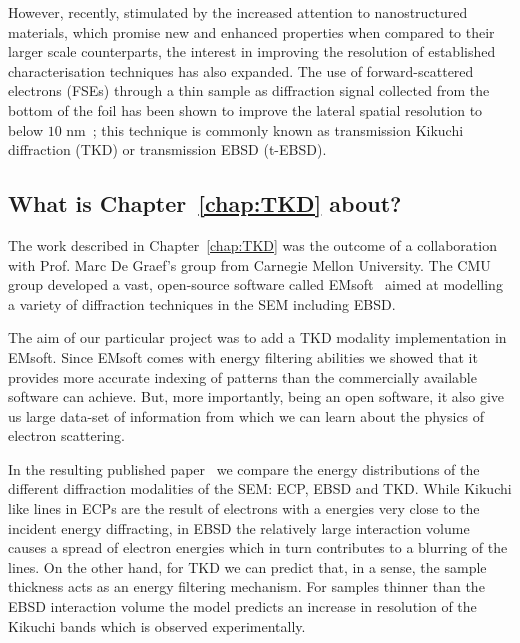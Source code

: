 However, recently, stimulated by the increased attention to nanostructured materials, which promise new and enhanced properties when compared to their larger scale counterparts, the interest in improving the resolution of established characterisation techniques has also expanded. The use of forward-scattered electrons (FSEs) through a thin sample as diffraction signal collected from the bottom of the foil has been shown to improve the lateral spatial resolution to below $10$ nm~\cite{Keller12, Trimby12}; this technique is commonly known as transmission Kikuchi diffraction (TKD) or transmission EBSD (t-EBSD). 

\subsection{What is Chapter~\ref{chap:TKD} about?}

The work described in Chapter~\ref{chap:TKD} was the outcome of a collaboration with Prof. Marc De Graef's group from Carnegie Mellon University. The CMU group developed a vast, open-source software called EMsoft~\cite{EMsoft} aimed at modelling a variety of diffraction techniques in the SEM including EBSD. 

The aim of our particular project was to add a TKD modality implementation in EMsoft. Since EMsoft comes with energy filtering abilities we showed that it provides more accurate indexing of patterns than the commercially available software can achieve. But, more importantly, being an open software, it also give us large data-set of information from which we can learn about the physics of electron scattering.  

In the resulting published paper~\cite{PascalTKD}  we compare the energy distributions of the different diffraction modalities of the SEM: ECP, EBSD and TKD. While Kikuchi like lines in ECPs are the result of electrons with a energies very close to the incident energy diffracting, in EBSD the relatively large interaction volume causes a spread of electron energies which in turn contributes to a blurring of the lines. On the other hand, for TKD we can predict that, in a sense, the sample thickness acts as an energy filtering mechanism. For samples thinner than the EBSD interaction volume the model predicts an increase in resolution of the Kikuchi bands which is observed experimentally. 